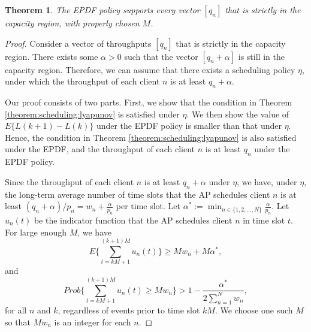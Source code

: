 \documentclass[10pt,nocopyrightspace]{sigplan-proc-varsize-1in}
\newtheorem{theorem}{Theorem}
\begin{document}
\begin{theorem} \label{theorem:scheduling:optimal}
The EPDF policy supports every vector $[q_n]$ that is strictly in the capacity region, with properly chosen $M$.
\end{theorem}
\begin{proof}
Consider a vector of throughputs $[q_n]$ that is strictly in the capacity region. There exists some $\alpha >0$ such that the vector $[q_n+\alpha]$ is still in the capacity region. Therefore, we can assume that there exists a scheduling policy $\eta$, under which the throughput of each client $n$ is at least $q_n+\alpha$.

Our proof consists of two parts. First, we show that the condition in Theorem \ref{theorem:scheduling:lyapunov} is satisfied under $\eta$. We then show the value of $E\{L(k+1)-L(k)\}$ under the EPDF policy is smaller than that under $\eta$. Hence, the condition in Theorem \ref{theorem:scheduling:lyapunov} is also satisfied under the EPDF, and the throughput of each client $n$ is at least $q_n$ under the EPDF policy.

Since the throughput of each client $n$ is at least $q_n+\alpha$ under $\eta$, we have, under $\eta$, the long-term average number of time slots that the AP schedules client $n$ is at least $(q_n+\alpha)/p_n=w_n+\frac{\alpha}{p_n}$ per time slot. Let $\alpha^*:=\min_{n\in\{1,2,\dots,N\}}\frac{\alpha}{p_n}$. Let $u_n(t)$ be the indicator function that the AP schedules client $n$ in time slot $t$. For large enough $M$, we have
\begin{equation}    \label{equation:schdueling:proof1}
E\{\sum_{t=kM+1}^{(k+1)M}u_n(t)\}\geq Mw_n+M\alpha^*,
\end{equation}
and
\begin{equation}    \label{equation:schdueling:proof2}
Prob\{\sum_{t=kM+1}^{(k+1)M}u_n(t)\geq Mw_n\}>1-\frac{\alpha^*}{2\sum_{n=1}^Nw_n},
\end{equation}
for all $n$ and $k$, regardless of events prior to time slot $kM$. We choose one such $M$ so that $Mw_n$ is an integer for each $n$.


\end{proof}
\end{document}

